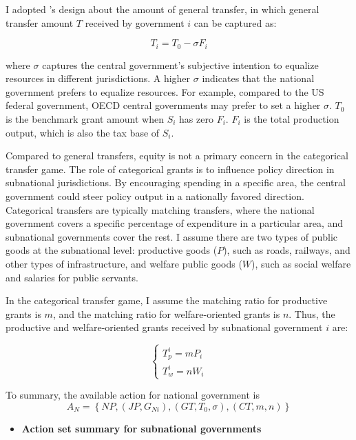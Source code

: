 \documentclass[man]{apa7}
\begin{document}
I adopted \Textcite{buettner2006incentive}'s design about the amount of general transfer, in which general transfer amount $T$ received by government $i$ can be captured as:

\begin{equation}
  T_i = T_0 - \sigma F_i\label{generaltransfer}
\end{equation}


where $\sigma$ captures the central government's subjective intention to equalize resources in different jurisdictions. A higher $\sigma$ indicates that the national government prefers to equalize resources. For example, compared to the US federal government, OECD central governments may prefer to set a higher $\sigma$. $T_0$ is the benchmark grant amount when $S_i$ has zero $F_i$. $F_i$ is the total production output, which is also the tax base of $S_i$.


Compared to general transfers, equity is not a primary concern in the categorical transfer game. The role of categorical grants is to influence policy direction in subnational jurisdictions. By encouraging spending in a specific area, the central government could steer policy output in a nationally favored direction. Categorical transfers are typically matching transfers, where the national government covers a specific percentage of expenditure in a particular area, and subnational governments cover the rest. I assume there are two types of public goods at the subnational level: productive goods ($P$), such as roads, railways, and other types of infrastructure, and welfare public goods ($W$), such as social welfare and salaries for public servants.%


In the categorical transfer game, I assume the matching ratio for productive grants is $m$, and the matching ratio for welfare-oriented grants is $n$. Thus, the productive and welfare-oriented grants received by subnational government $i$ are:

\begin{equation}
  \left\{\begin{array}{l}
    T_p^i=m P_i \\
    T_w^i=n W_i
  \end{array}\right.\label{mrmatrix}
\end{equation}

To summary, the available action for national government is $$A_N=\left\{N P,\left(J P, G_{Ni}\right),\left(G T, T_0, \sigma\right),(C T, m,n)\right\} $$

\begin{itemize}
  \item \textbf{Action set summary for subnational governments}
\end{itemize}
\end{document}
